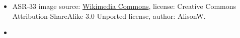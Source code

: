 \documentclass{article}
\begin{document}

\begin{itemize}
\item ASR-33 image source:
  \href{http://en.wikipedia.org/wiki/File:Teletype_with_papertape_punch_and_reader.jpg}{Wikimedia
    Commons}, license: Creative Commons Attribution-ShareAlike 3.0
  Unported license, author: AlisonW.
\item 
\end{itemize}



\end{document}
